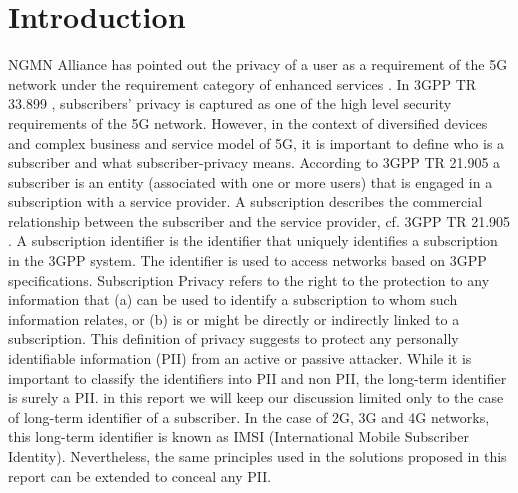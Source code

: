\documentclass[lnicst,sechang,a4paper]{svmultln}
\begin{document}
\section{Introduction}
\label{intro} NGMN Alliance has pointed out the privacy of a user as a requirement of the 5G network under the requirement category of enhanced services \cite{NGMN_white_paper}. In 3GPP TR 33.899 \cite{TR33899}, subscribers' privacy is captured as one of the high level security requirements of the 5G network. However, in the context of diversified devices and complex business and service model of 5G, it is important to define who is a subscriber and what subscriber-privacy means. According to 3GPP TR 21.905 \cite{TR21905} a subscriber is an entity (associated with one or more users) that is engaged in a subscription with a service provider. A subscription describes the commercial relationship between the subscriber and the service provider, cf. 3GPP TR 21.905 \cite{TR21905}. A subscription identifier is the identifier that uniquely identifies a subscription in the 3GPP system. The identifier is used to access networks based on 3GPP specifications. Subscription Privacy refers to the right to the protection to any information that (a) can be used to identify a subscription to whom such information relates, or (b) is or might be directly or indirectly linked to a subscription. This definition of privacy suggests to protect any personally identifiable information (PII) from an active or passive attacker. While it is important to classify the identifiers into PII and non PII, the long-term identifier is surely a PII. in this report we will keep our discussion limited only to the case of long-term identifier of a subscriber. In the case of 2G, 3G and 4G networks, this long-term identifier is known as IMSI (International Mobile Subscriber Identity). Nevertheless, the same principles used in the solutions proposed in this report can be extended to conceal any PII.
\end{document}
